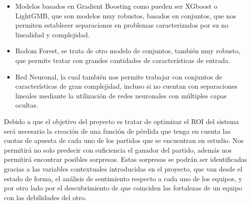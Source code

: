 \begin{itemize}
    \item Modelos basados en Gradient Boosting como pueden ser XGboost o LightGMB, que son modelos muy robustos, basados en conjuntos, que nos permiten establecer separaciones en problemas caracterizados por su no linealidad y complejidad.
    \item Rodom Forest, se trata de otro modelo de conjuntos, también muy robusto, que permite tratar con grandes cantidades de características de entrada.
    \item Red Neuronal, la cual también nos permite trabajar con conjuntos de características de gran complejidad, incluso si no cuentan con separaciones lineales mediante la utilización de redes neuronales con múltiples capas ocultas.
\end{itemize}

Debido a que el objetivo del proyecto es tratar de optimizar el ROI del sistema será necesario la creación de una función de pérdida que tenga en cuenta las cuotas de apuesta de cada uno de los partidos que se encuentran en estudio. Nos permitirá no solo predecir con suficiencia el ganador del partido, además nos permitirá encontrar posibles sorpresas. Estas sorpresas se podrán ser identificadas gracias a las variables contextuales introducidas en el proyecto, que van desde el estado de forma, el análisis de sentimiento respecto a cada uno de los equipos, y por otro lado por el descubrimiento de que coinciden las fortalezas de un equipo con las debilidades del otro.